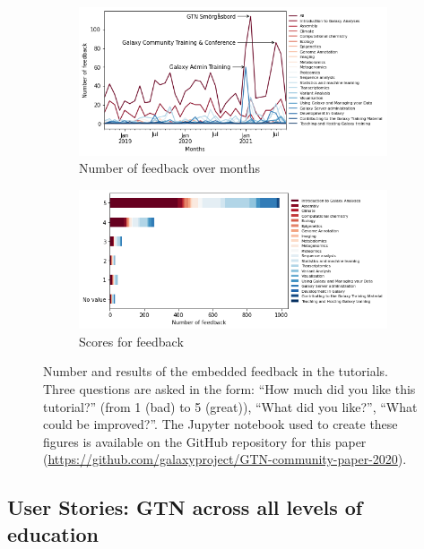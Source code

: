 \documentclass[10pt,letterpaper]{article}
\begin{document}
\begin{figure}[!ht]
	\centering
	\begin{subfigure}[b]{0.7\textwidth}
         \centering
         \includegraphics[width=\textwidth]{images/feedback.png}
         \caption{Number of feedback over months}
         \label{fig:feedback-}
    \end{subfigure}
    \hfill
    \begin{subfigure}[b]{0.7\textwidth}
         \centering
         \includegraphics[width=\textwidth]{images/feedback-scores.png}
         \caption{Scores for feedback}
         \label{fig:feedback-scores}
    \end{subfigure}
	\caption{Number and results of the embedded feedback in the tutorials. Three questions are asked in the form: ``How much did you like this tutorial?'' (from 1 (bad) to 5 (great)), ``What did you like?'', ``What could be improved?''. The Jupyter notebook used to create these figures is available on the GitHub repository for this paper (\url{https://github.com/galaxyproject/GTN-community-paper-2020}).
    \label{fig:feedback}}
\end{figure}



\subsection*{User Stories: GTN across all levels of education}\label{sec:userstories}
\end{document}
